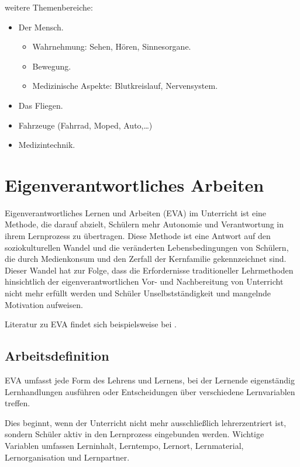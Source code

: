 weitere Themenbereiche:
\begin{itemize}
\setlength{\itemsep}{0mm}
\item Der Mensch.
\begin{itemize}
\setlength{\itemsep}{0mm}
\item
Wahrnehmung: Sehen, H\"{o}ren, Sinnesorgane.
\item
Bewegung.
\item
Medizinische Aspekte: Blutkreislauf, Nervensystem.
\end{itemize}
	\item Das Fliegen.
	\item Fahrzeuge (Fahrrad, Moped, Auto,\dots)
	\item Medizintechnik.
\end{itemize}


\section{Eigenverantwortliches Arbeiten}\label{EVA}

Eigenverantwortliches Lernen und Arbeiten (EVA) im Unterricht ist eine Methode, die darauf abzielt, Sch\"ulern mehr Autonomie und Verantwortung in ihrem Lernprozess zu \"ubertragen. Diese Methode ist eine Antwort auf den soziokulturellen Wandel und die ver\"anderten Lebensbedingungen von Sch\"ulern, die durch Medienkonsum und den Zerfall der Kernfamilie gekennzeichnet sind. Dieser Wandel hat zur Folge, dass die Erfordernisse traditioneller Lehrmethoden hinsichtlich der eigenverantwortlichen Vor- und Nachbereitung von Unterricht nicht mehr erf\"ullt werden und Sch\"uler Unselbstst\"andigkeit und mangelnde Motivation aufweisen. 

Literatur zu EVA findet sich beispielsweise bei \textcites{Klippert,Landherr}.

\subsection{Arbeitsdefinition}
EVA umfasst jede Form des Lehrens und Lernens, bei der Lernende eigenständig Lernhandlungen ausführen oder Entscheidungen über verschiedene Lernvariablen treffen.

Dies beginnt, wenn der Unterricht nicht mehr ausschließlich lehrerzentriert ist, sondern Schüler aktiv in den Lernprozess eingebunden werden. Wichtige Variablen umfassen Lerninhalt, Lerntempo, Lernort, Lernmaterial, Lernorganisation und Lernpartner.

